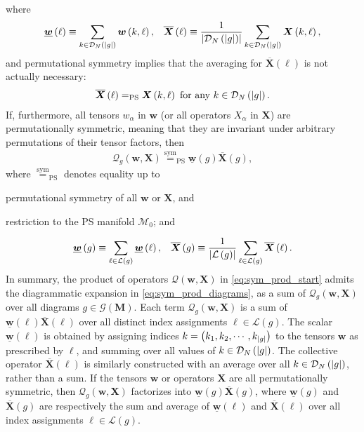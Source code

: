 \documentclass[nofootinbib,notitlepage,11pt]{revtex4-2}
\renewcommand{\t}{\text} %
\newcommand{\f}[2]{\dfrac{#1}{#2}} %
\newcommand{\p}[1]{\left(#1\right)} %
\newcommand{\m}{\bm} %
\newcommand{\1}{\mathds{1}}
\newcommand{\D}{\mathcal{D}}
\newcommand{\G}{\mathcal{G}}
\renewcommand{\L}{\mathcal{L}}
\newcommand{\M}{\mathcal{M}}
\newcommand{\Q}{\mathcal{Q}}
\newcommand{\EQPS}{=_{\text{PS}}}
\newcommand{\col}{\underline}
\newcommand{\mean}{\overline}
\begin{document}
where
\begin{align}
  \col{\m w}\p{\ell} \equiv \sum_{k\in\D_N\p{\abs{g}}} \m w\p{k,\ell},
  &&
  \mean{\m X}\p{\ell}
  \equiv \f1{\abs{\D_N\p{\abs{g}}}}
  \sum_{k\in\D_N\p{\abs{g}}} \m X\p{k,\ell},
\end{align}
and permutational symmetry implies that the averaging for
$\mean{\m X}\p{\ell}$ is not actually necessary:
\begin{align}
  \mean{\m X}\p{\ell}
  \EQPS \m X\p{k,\ell} ~\t{for any}~ k\in\D_N\p{\abs{g}}.
\end{align}
If, furthermore, all tensors $w_\alpha$ in $\m w$ (or all operators
$X_\alpha$ in $\m X$) are permutationally symmetric, meaning that they
are invariant under arbitrary permutations of their tensor factors,
then
\begin{align}
  \Q_g\p{\m w,\m X}
  \stackrel{\t{sym}}{=}_{\t{PS}} \col{\m w}\p{g} \mean{\m X}\p{g},
  \label{eq:sum_diagrams}
\end{align}
where $\stackrel{\t{sym}}{=}_{\t{PS}}$ denotes equality up to
\begin{enumerate*}
\item permutational symmetry of all $\m w$ or $\m X$, and
\item restriction to the PS manifold $\M_0$; and
\end{enumerate*}
\begin{align}
  \col{\m w}\p{g} \equiv \sum_{\ell\in\L\p{g}} \col{\m w}\p{\ell},
  &&
  \mean{\m X}\p{g} \equiv \f1{\abs{\L\p{g}}}
  \sum_{\ell\in\L\p{g}} \mean{\m X}\p{\ell}.
\end{align}
In summary, the product of operators $\Q\p{\m w,\m X}$ in
\eqref{eq:sym_prod_start} admits the diagrammatic expansion in
\eqref{eq:sym_prod_diagrams}, as a sum of $\Q_g\p{\m w,\m X}$ over all
diagrams $g\in\G\p{\m M}$.  Each term $\Q_g\p{\m w,\m X}$ is a sum of
$\col{\m w}\p{\ell}\mean{\m X}\p{\ell}$ over all distinct index
assignments $\ell\in\L\p{g}$.  The scalar $\col{\m w}\p{\ell}$ is
obtained by assigning indices $k=\p{k_1,k_2,\cdots,k_{\abs{g}}}$ to
the tensors $\m w$ as prescribed by $\ell$, and summing over all
values of $k\in\D_N\p{\abs{g}}$.  The collective operator
$\mean{\m X}\p{\ell}$ is similarly constructed with an average over
all $k\in\D_N\p{\abs{g}}$, rather than a sum.  If the tensors $\m w$
or operators $\m X$ are all permutationally symmetric, then
$\Q_g\p{\m w,\m X}$ factorizes into $\col{\m w}\p{g}\mean{\m X}\p{g}$,
where $\col{\m w}\p{g}$ and $\mean{\m X}\p{g}$ are respectively the
sum and average of $\col{\m w}\p{\ell}$ and $\mean{\m X}\p{\ell}$ over
all index assignments $\ell\in\L\p{g}$.
\end{document}
